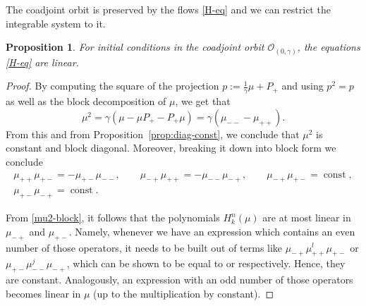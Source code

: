 \documentclass[pdftex]{sigma}
\newtheorem{prop}[thm]{Proposition}
\theoremstyle{definition}
\numberwithin{equation}{section}
\DeclareMathOperator{\const}{const}
\newcommand{\be}{\begin{equation}}
\newcommand{\ee}{\end{equation}}
\begin{document}
The coadjoint orbit is preserved by the flows \eqref{H-eq} and we can restrict the integrable system to it.
\begin{prop}\label{prop:mu-linear}
For initial conditions in the coadjoint orbit $\mathcal O_{(0,\gamma)}$, the equations \eqref{H-eq} are linear.
\end{prop}
\begin{proof}
By computing the square of the projection $p:= \frac{1}{\gamma}\mu + P_+$ and using $p^2 = p$ as well as the block decomposition of $\mu$, we get that
\be \label{mu2} \mu^2 = \gamma (\mu-\mu P_+ - P_+\mu) = \gamma(\mu_{--}-\mu_{++}).\ee
From this and from Proposition~\ref{prop:diag-const}, we conclude that $\mu^2$ is constant and block diagonal. Moreover, breaking it down into block form we conclude
\begin{gather}\label{mu2-block}
\mu_{++} \mu_{+-} = - \mu_{+-}\mu_{--},\qquad
\mu_{-+} \mu_{++} = - \mu_{--}\mu_{-+},\qquad
\mu_{-+}\mu_{+-} = \const,\nonumber\\
\mu_{+-}\mu_{-+} = \const.
\end{gather}

From \eqref{mu2-block}, it follows that the polynomials $H^n_k(\mu)$ are at most linear in $\mu_{-+}$ and $\mu_{+-}$. Namely, whenever we have an expression which contains an even number of those operators, it needs to be built out of terms like $\mu_{-+}\mu_{++}^l\mu_{+-}$ or $\mu_{+-}\mu_{--}^j\mu_{-+}$, which can be shown to be equal to  or  respectively. Hence, they are constant. Analogously, an expression with an odd number of those operators becomes linear in $\mu$ (up to the multiplication by constant).
\end{proof}
\end{document}
